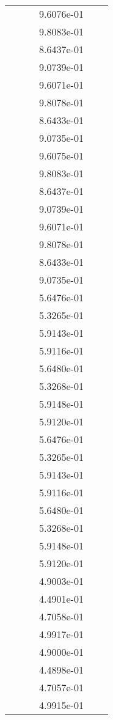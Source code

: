 \begin{xltabular}{\textwidth}{r|rS[table-format=1.3e+2]S[table-format=1.4e+2]S[table-format=1.4e+2]S[table-format=-1.5]}
&  &  & 9.6076e-01 & & \\
&  &  & 9.8083e-01 & & \\
&  &  & 8.6437e-01 & & \\
&  &  & 9.0739e-01 & & \\
&  &  & 9.6071e-01 & & \\
&  &  & 9.8078e-01 & & \\
&  &  & 8.6433e-01 & & \\
&  &  & 9.0735e-01 & & \\
&  &  & 9.6075e-01 & & \\
&  &  & 9.8083e-01 & & \\
&  &  & 8.6437e-01 & & \\
&  &  & 9.0739e-01 & & \\
&  &  & 9.6071e-01 & & \\
&  &  & 9.8078e-01 & & \\
&  &  & 8.6433e-01 & & \\
&  &  & 9.0735e-01 & & \\
&  &  & 5.6476e-01 & & \\
&  &  & 5.3265e-01 & & \\
&  &  & 5.9143e-01 & & \\
&  &  & 5.9116e-01 & & \\
&  &  & 5.6480e-01 & & \\
&  &  & 5.3268e-01 & & \\
&  &  & 5.9148e-01 & & \\
&  &  & 5.9120e-01 & & \\
&  &  & 5.6476e-01 & & \\
&  &  & 5.3265e-01 & & \\
&  &  & 5.9143e-01 & & \\
&  &  & 5.9116e-01 & & \\
&  &  & 5.6480e-01 & & \\
&  &  & 5.3268e-01 & & \\
&  &  & 5.9148e-01 & & \\
&  &  & 5.9120e-01 & & \\
&  &  & 4.9003e-01 & & \\
&  &  & 4.4901e-01 & & \\
&  &  & 4.7058e-01 & & \\
&  &  & 4.9917e-01 & & \\
&  &  & 4.9000e-01 & & \\
&  &  & 4.4898e-01 & & \\
&  &  & 4.7057e-01 & & \\
&  &  & 4.9915e-01 & & \\

\end{xltabular}
